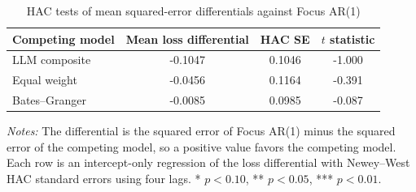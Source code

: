 \begin{table}[htbp]
\color{revisionred}
\centering
\begin{threeparttable}
\caption{HAC tests of mean squared-error differentials against Focus AR(1)}
\label{tab:llm-gw}
\begin{footnotesize}
\begin{tabular}{lccc}
\toprule
Competing model & Mean loss differential & HAC SE & $t$ statistic \\
\midrule
LLM composite & -0.1047 & 0.1046 & -1.000 \\
Equal weight & -0.0456 & 0.1164 & -0.391 \\
Bates--Granger & -0.0085 & 0.0985 & -0.087 \\
\bottomrule
\end{tabular}
\begin{tablenotes}[flushleft]
\scriptsize
\item \textit{Notes:} The differential is the squared error of Focus AR(1) minus the squared error of the competing model, so a positive value favors the competing model. Each row is an intercept-only regression of the loss differential with Newey--West HAC standard errors using four lags. * $p<0.10$, ** $p<0.05$, *** $p<0.01$.
\end{tablenotes}
\end{footnotesize}
\end{threeparttable}
\end{table}
